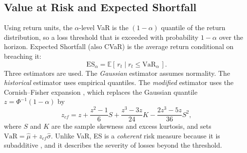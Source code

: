 \documentclass[11pt,a4paper]{article}
\begin{document}
\subsection{Value at Risk and Expected Shortfall}
Using return units, the $\alpha$-level VaR is the $(1-\alpha)$ quantile of the return distribution, so a loss threshold that is exceeded with probability $1-\alpha$ over the horizon. Expected Shortfall (also CVaR) is the average return conditional on breaching it:
\begin{equation}
  \mathrm{ES}_\alpha = \mathbb{E}\left[\,r_t \mid r_t \le \mathrm{VaR}_\alpha\,\right].
\end{equation}
Three estimators are used. The \emph{Gaussian} estimator assumes normality. The \emph{historical} estimator uses empirical quantiles. The \emph{modified} estimator uses the Cornish--Fisher expansion \cite{favre2002}, which replaces the Gaussian quantile $z=\Phi^{-1}(1-\alpha)$ by
\begin{equation}
  z_{cf} = z + \frac{z^2-1}{6}S + \frac{z^3-3z}{24}K - \frac{2z^3-5z}{36}S^2,
\end{equation}
where $S$ and $K$ are the sample skewness and excess kurtosis, and sets $\mathrm{VaR}=\hat\mu+z_{cf}\hat\sigma$. Unlike VaR, ES is a \emph{coherent} risk measure because it is subadditive \cite{artzner1999,acerbi2002}, and it describes the severity of losses beyond the threshold.

\end{document}
